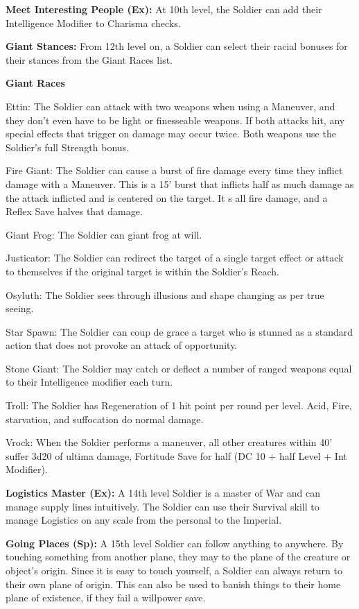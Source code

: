 \textbf{Meet Interesting People (Ex):} At 10th level, the Soldier can add their Intelligence Modifier to Charisma checks.

\textbf{Giant Stances:} From 12th level on, a Soldier can select their racial bonuses for their stances from the Giant Races list.

\textbf{Giant Races}
\begin{description*}
\item[Ettin:] The Soldier can attack with two weapons when using a Maneuver, and they don't even have to be light or finesseable weapons. If both attacks hit, any special effects that trigger on damage may occur twice. Both weapons use the Soldier's full Strength bonus.
\item[Fire Giant:] The Soldier can cause a burst of fire damage every time they inflict damage with a Maneuver. This is a 15' burst that inflicts half as much damage as the attack inflicted and is centered on the target. It s all fire damage, and a Reflex Save halves that damage.
\item[Giant Frog:] The Soldier can giant frog at will.
\item[Justicator:] The Soldier can redirect the target of a single target effect or attack to themselves if the original target is within the Soldier's Reach.
\item[Osyluth:] The Soldier sees through illusions and shape changing as per true seeing.
\item[Star Spawn:] The Soldier can coup de grace a target who is stunned as a standard action that does not provoke an attack of opportunity.
\item[Stone Giant:] The Soldier may catch or deflect a number of ranged weapons equal to their Intelligence modifier each turn.
\item[Troll:] The Soldier has Regeneration of 1 hit point per round per level. Acid, Fire, starvation, and suffocation do normal damage.
\item[Vrock:] When the Soldier performs a maneuver, all other creatures within 40' suffer 3d20 of ultima damage, Fortitude Save for half (DC 10 + half Level + Int Modifier).
\end{description*}

\textbf{Logistics Master (Ex):} A 14th level Soldier is a master of War and can manage supply lines intuitively. The Soldier can use their Survival skill to manage Logistics on any scale from the personal to the Imperial.

\textbf{Going Places (Sp):} A 15th level Soldier can follow anything to anywhere. By touching something from another plane, they may  to the plane of the creature or object's origin. Since it is easy to touch yourself, a Soldier can always return to their own plane of origin. This can also be used to banish things to their home plane of existence, if they fail a willpower save.

